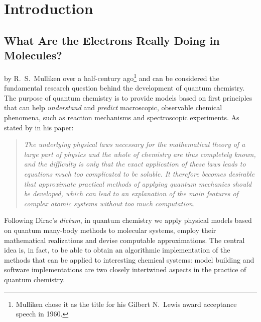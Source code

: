 {}

\chapter*{Introduction}

\renewcommand{\thefigure}{\Alph{figure}}

\begin{epigraphs}
\end{epigraphs}


\section*{What Are the Electrons Really Doing in Molecules?}

 by R.~S.~Mulliken over a half-century
ago\footnote{Mulliken chose it as the title for his Gilbert N.~Lewis
award acceptance speech in 1960.}
and can be considered the fundamental research question behind the
development of quantum chemistry.
The purpose of quantum chemistry is to provide models based on first
principles that can help \emph{understand} and \emph{predict}
macroscopic, observable chemical phenomena, such as reaction mechanisms and
spectroscopic experiments.\autocite{Kovac2011-ew}
As stated by \citeauthor{Dirac1929-gn} in his 
paper:\autocite{Dirac1929-gn, Kutzelnigg2000-fl}
\blockquote{\small\textit{The underlying physical laws necessary for the mathematical
theory of a large part of physics and the whole of chemistry are thus
completely known, and the difficulty is only that the exact application of
these laws leads to equations much too complicated to be soluble. It
therefore becomes desirable that approximate practical methods of
applying quantum mechanics should be developed, which can lead to an
explanation of the main features of complex atomic systems without too
much computation.}}
Following Dirac's \emph{dictum}, in quantum chemistry we apply physical
models based on quantum many-body methods to molecular systems, employ
their mathematical realizations and devise computable approximations.
The central idea is, in fact, to be able to obtain an algorithmic
implementation of the methods that can be applied to interesting
chemical systems: model building and software implementations are two
closely intertwined aspects in the practice of quantum
chemistry.\autocite{Winsberg2010-sy}


